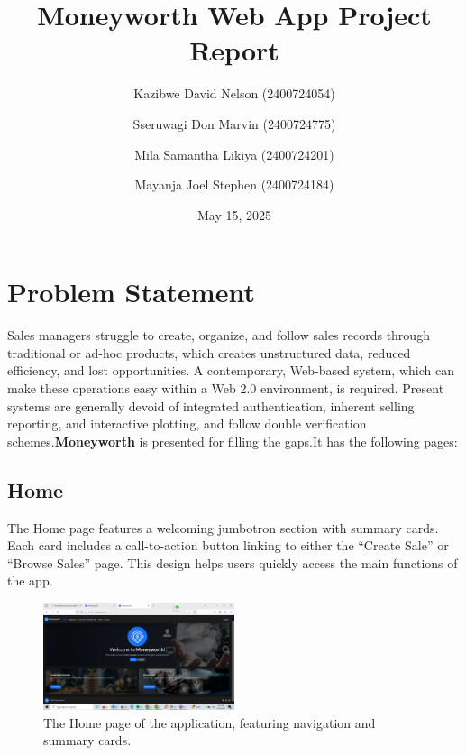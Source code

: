 \documentclass[12pt]{article}
\title{Moneyworth Web App Project Report}
\author{Kazibwe David Nelson (2400724054) \and Sseruwagi Don Marvin (2400724775) 
\and Mila Samantha Likiya (2400724201) \and Mayanja Joel Stephen (2400724184)}
\date{May 15, 2025}
\begin{document}
\maketitle

\section{Problem Statement}
Sales managers struggle to create, organize, and follow sales records through traditional or ad-hoc products,
which creates unstructured data, reduced efficiency, and lost opportunities. A contemporary, Web-based system, 
which can make these operations easy within a Web 2.0 environment, is required. Present systems are generally 
devoid of integrated authentication, inherent selling reporting, and interactive plotting, and follow double
 verification schemes.\textbf{Moneyworth} is presented for filling the gaps.It has the following pages:

\subsection{Home}
The Home page features a welcoming jumbotron section with summary cards. Each card includes a call-to-action 
button linking to either the ``Create Sale'' or ``Browse Sales'' page. This design helps users quickly access
 the main functions of the app.
\begin{figure}[H]
    \centering
    \includegraphics[width=0.5\textwidth]{home.png}
    \caption{The Home page of the application, featuring navigation and summary cards.}
\end{figure}
\end{document}
